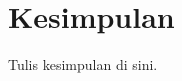 \documentclass[journal]{IEEEtran}
\begin{document}
\section{Kesimpulan}
\label{sec:conclusion}

Tulis kesimpulan di sini.

\appendices
\label{sec:appendixA}






\end{document}

